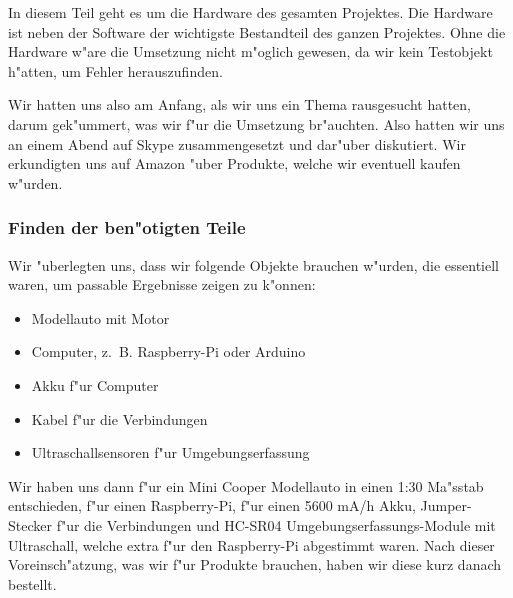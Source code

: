 \documentclass[a4paper,12pt]{article}
\newenvironment{myitemize}{
	\begin{itemize}
		\setlength{\itemsep}{0pt}
		\setlength{\parskip}{0pt}
		\setlength{\parsep}{0pt}
}
{
	\end{itemize}
}
\begin{document}
In diesem Teil geht es um die Hardware des gesamten Projektes.
Die Hardware ist neben der Software der wichtigste Bestandteil des ganzen Projektes.
Ohne die Hardware w"are die Umsetzung nicht m"oglich gewesen, da wir kein Testobjekt h"atten, um Fehler herauszufinden.

Wir hatten uns also am Anfang, als wir uns ein Thema rausgesucht hatten, darum gek"ummert, was wir f"ur die Umsetzung br"auchten.
Also hatten wir uns an einem Abend auf Skype zusammengesetzt und dar"uber diskutiert.
Wir erkundigten uns auf Amazon "uber Produkte, welche wir eventuell kaufen w"urden.

\subsubsection{Finden der ben"otigten Teile}\label{sec2.1.1}

Wir "uberlegten uns, dass wir folgende Objekte brauchen w"urden, die essentiell waren, um passable Ergebnisse zeigen zu k"onnen:

\begin{myitemize}
	\item Modellauto mit Motor
	\item Computer, z.~B. Raspberry-Pi oder Arduino
	\item Akku f"ur Computer
	\item Kabel f"ur die Verbindungen
	\item Ultraschallsensoren f"ur Umgebungserfassung
\end{myitemize}

Wir haben uns dann f"ur ein Mini Cooper Modellauto in einen 1:30 Ma"sstab entschieden, f"ur einen Raspberry-Pi, f"ur einen 5600 mA/h Akku, Jumper-Stecker f"ur die Verbindungen und HC-SR04 Umgebungserfassungs-Module mit Ultraschall, welche extra f"ur den Raspberry-Pi abgestimmt waren.
Nach dieser Voreinsch"atzung, was wir f"ur Produkte brauchen, haben wir diese kurz danach bestellt.
\end{document}
